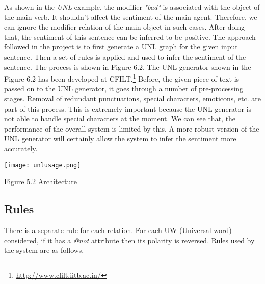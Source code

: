 As shown in the \textit{UNL} example, the modifier \textit{"bad"} is associated with the object of the main verb. It shouldn't affect the sentiment of the main agent. 
Therefore, we can ignore the modifier relation of the main object in such cases. After doing that, the sentiment of this sentence can be inferred to be positive.
The approach followed in the project is to first generate a UNL graph for the given input sentence. Then a set of rules is applied and used to infer the sentiment of the
sentence. The process is shown in Figure 6.2. The UNL generator shown in the Figure 6.2 has been developed at CFILT.\footnote{\url{http://www.cfilt.iitb.ac.in/}} Before, the given piece of text is passed on to the UNL 
generator, it goes through a number of pre-processing stages. Removal of redundant punctuations, special characters, emoticons, etc. are part of this process. This is
extremely important because the UNL generator is not able to handle special characters at the moment. We can see that, the performance of the overall system is limited
by this. A more robust version of the UNL generator will certainly allow the system to infer the sentiment more accurately.
  
\texttt{[image: unlusage.png]} 
\begin{center}
 Figure 5.2 Architecture
\end{center}
  
\subsection{Rules}

There is a separate rule for each relation. For each UW (Universal word) considered, if it has a \textit{@not} attribute then its polarity is reversed. Rules used by the system
are as follows,

